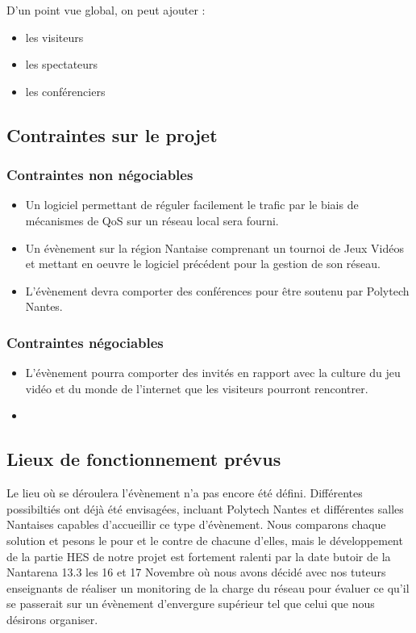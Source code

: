 \documentclass[french]{article}
\begin{document}
D'un point vue global, on peut ajouter :
\begin{itemize}
	\item les visiteurs
	\item les spectateurs
	\item les conférenciers
\end{itemize}

\subsection{Contraintes sur le projet}

\subsubsection{Contraintes non négociables}

\begin{itemize}
	\item Un logiciel permettant de réguler facilement le trafic par le biais de mécanismes de QoS sur un réseau local sera fourni.
	\item Un évènement sur la région Nantaise comprenant un tournoi de Jeux Vidéos et mettant en oeuvre le logiciel précédent pour la gestion de son réseau.
	\item L'évènement devra comporter des conférences pour être soutenu par Polytech Nantes.
\end{itemize}

\subsubsection{Contraintes négociables}

\begin{itemize}
	\item L'évènement pourra comporter des invités en rapport avec la culture du jeu vidéo et du monde de l'internet que les visiteurs pourront rencontrer.
	\item 
\end{itemize}

\subsection{Lieux de fonctionnement prévus}

Le lieu où se déroulera l'évènement n'a pas encore été défini. Différentes possibiltiés ont déjà été envisagées, incluant Polytech Nantes et différentes salles Nantaises capables d'accueillir ce type d'évènement. Nous comparons chaque solution et pesons le pour et le contre de chacune d'elles, mais le développement de la partie HES de notre projet est fortement ralenti par la date butoir de la Nantarena 13.3 les 16 et 17 Novembre où nous avons décidé avec nos tuteurs enseignants de réaliser un monitoring de la charge du réseau pour évaluer ce qu'il se passerait sur un évènement d'envergure supérieur tel que celui que nous désirons organiser.
\end{document}
